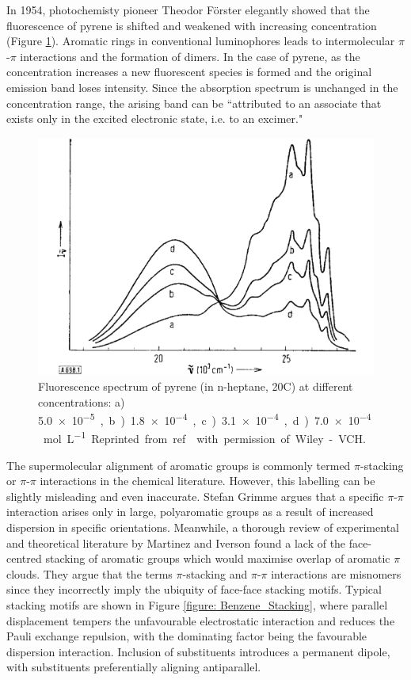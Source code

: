 In 1954, photochemisty pioneer Theodor F\"{o}rster elegantly showed that the fluorescence of pyrene is shifted and weakened with increasing concentration (Figure \ref{figure: Forster_Spectra}).\cite{Forster1954,Forster1969} Aromatic rings in conventional luminophores leads to intermolecular $\pi$-$\pi$ interactions and the formation of dimers. In the case of pyrene, as the concentration increases a new fluorescent species is formed and the original emission band loses intensity. Since the absorption spectrum is unchanged in the concentration range, the arising band can be ``attributed to an associate that exists only in the excited electronic state, i.e. to an excimer."\cite{Forster1969}
\begin{figure}[H]
\centering
  \includegraphics[width=0.6\linewidth]{1Intro/Forster_Spectra.pdf}
  \caption[Fluorescence spectrum of pyrene]{Fluorescence spectrum of pyrene (in n-heptane, 20\degree{}C) at different concentrations: a) \SI{5.0e-5}, b) \SI{1.8e-4}, c) \SI{3.1e-4}, d) \SI{7.0e-4}{mol L^{-1}}. Reprinted from ref.~ with permission of Wiley-VCH.}
  \label{figure: Forster_Spectra}
\end{figure}
The supermolecular alignment of aromatic groups is commonly termed $\pi$-stacking or $\pi$-$\pi$ interactions in the chemical literature. However, this labelling can be slightly misleading and even inaccurate.\cite{Grimme2008,Martinez2012} Stefan Grimme argues that a specific $\pi$-$\pi$ interaction arises only in large, polyaromatic groups as a result of increased dispersion in specific orientations.\cite{Grimme2008} Meanwhile, a thorough review of experimental and theoretical literature by Martinez and Iverson found a lack of the face-centred stacking of aromatic groups which would maximise overlap of aromatic $\pi$ clouds.\cite{Martinez2012} They argue that the terms $\pi$-stacking and $\pi$-$\pi$ interactions are misnomers since they incorrectly imply the ubiquity of face-face stacking motifs. Typical stacking motifs are shown in Figure \ref{figure: Benzene_Stacking}, where parallel displacement tempers the unfavourable electrostatic interaction and reduces the Pauli exchange repulsion, with the dominating factor being the favourable dispersion interaction. Inclusion of substituents introduces a permanent dipole, with substituents preferentially aligning antiparallel.\cite{Martinez2012}

